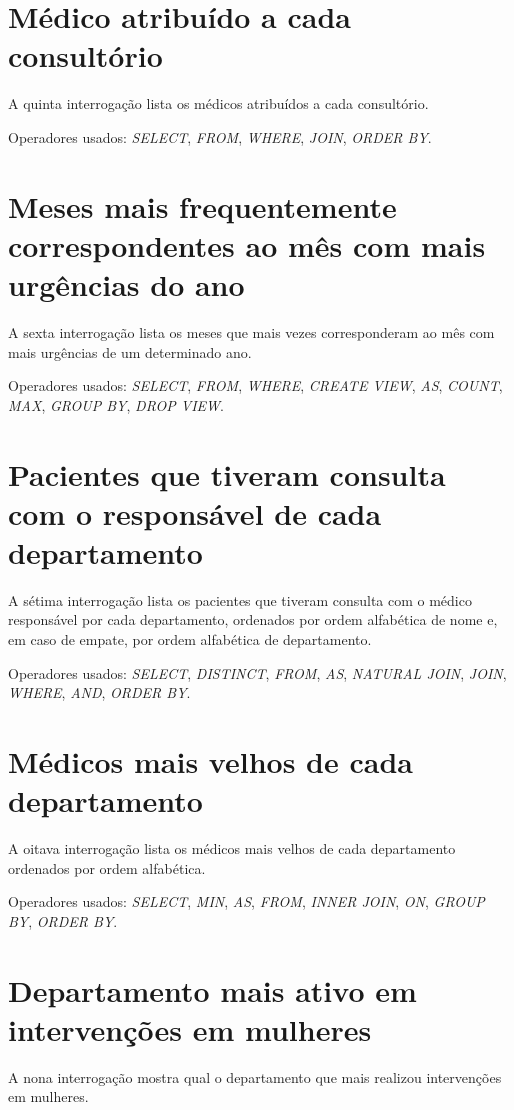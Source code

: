 \documentclass[article, a4paper, 12pt, oneside]{memoir}
\begin{document}
\section{Médico atribuído a cada consultório}
A quinta interrogação lista os médicos atribuídos a cada consultório.

Operadores usados: \emph{SELECT}, \emph{FROM}, \emph{WHERE}, \emph{JOIN}, \emph{ORDER BY}.

\section{Meses mais frequentemente correspondentes ao mês com mais urgências do ano}
A sexta interrogação lista os meses que mais vezes corresponderam ao mês com mais urgências de um determinado ano.

Operadores usados: \emph{SELECT}, \emph{FROM}, \emph{WHERE}, \emph{CREATE VIEW}, \emph{AS}, \emph{COUNT}, \emph{MAX}, \emph{GROUP BY}, \emph{DROP VIEW}.

\section{Pacientes que tiveram consulta com o responsável de cada departamento}
A sétima interrogação lista os pacientes que tiveram consulta com o médico responsável por cada departamento, ordenados por ordem alfabética de nome e, em caso de empate, por ordem alfabética de departamento.

Operadores usados: \emph{SELECT}, \emph{DISTINCT}, \emph{FROM}, \emph{AS}, \emph{NATURAL JOIN}, \emph{JOIN}, \emph{WHERE}, \emph{AND}, \emph{ORDER BY}.

\section{Médicos mais velhos de cada departamento}
A oitava interrogação lista os médicos mais velhos de cada departamento ordenados por ordem alfabética.

Operadores usados: \emph{SELECT}, \emph{MIN}, \emph{AS}, \emph{FROM}, \emph{INNER JOIN}, \emph{ON}, \emph{GROUP BY}, \emph{ORDER BY}.

\section{Departamento mais ativo em intervenções em mulheres}
A nona interrogação mostra qual o departamento que mais realizou intervenções em mulheres.
\end{document}

